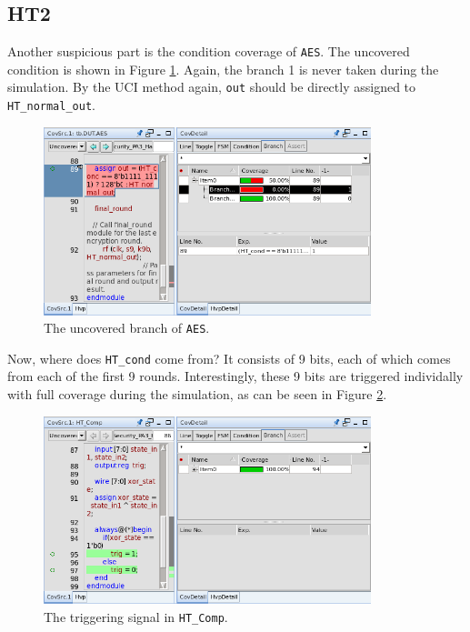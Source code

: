 \documentclass{article}
\begin{document}
\subsection{HT2}

Another suspicious part is the condition coverage of \verb|AES|. The uncovered condition is shown in Figure \ref{HT2-1}. Again, the branch 1 is never taken during the simulation. By the UCI method again, \verb|out| should be directly assigned to \verb|HT_normal_out|.

\begin{figure}[htp] \centering
\includegraphics[width=0.85\textwidth]{HT2-1}
\caption{The uncovered branch of \texttt{AES}.}
\label{HT2-1}
\end{figure}

Now, where does \verb|HT_cond| come from? It consists of 9 bits, each of which comes from each of the first 9 rounds. Interestingly, these 9 bits are triggered individally with full coverage during the simulation, as can be seen in Figure \ref{HT2-2}.

\begin{figure}[htp] \centering
\includegraphics[width=0.85\textwidth]{HT2-2}
\caption{The triggering signal in \texttt{HT\_Comp}.}
\label{HT2-2}
\end{figure}
\end{document}
